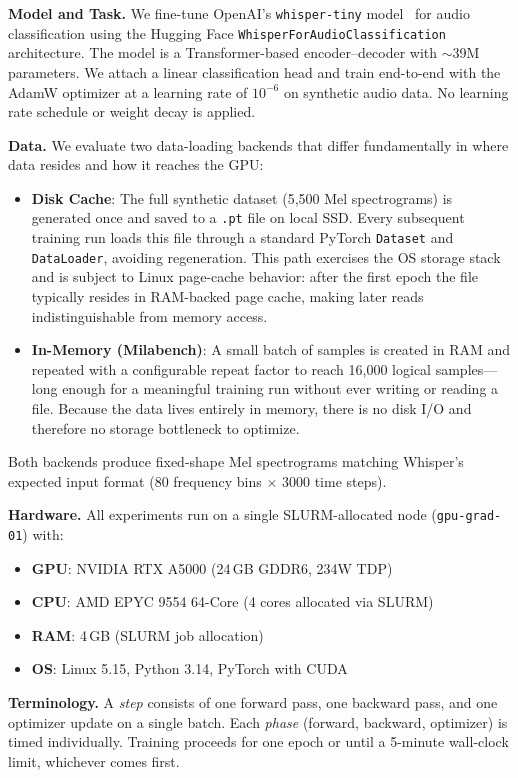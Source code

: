 \documentclass[10pt,twocolumn]{article}
\begin{document}
\textbf{Model and Task.}
We fine-tune OpenAI's \texttt{whisper-tiny} model~\cite{whisper} for audio classification using the Hugging Face \texttt{WhisperForAudioClassification} architecture. The model is a Transformer-based encoder--decoder with $\sim$39M parameters. We attach a linear classification head and train end-to-end with the AdamW optimizer at a learning rate of $10^{-6}$ on synthetic audio data. No learning rate schedule or weight decay is applied.

\textbf{Data.}
We evaluate two data-loading backends that differ fundamentally in where data resides and how it reaches the GPU:
\begin{itemize}
    \item \textbf{Disk Cache}: The full synthetic dataset (5{,}500 Mel spectrograms) is generated once and saved to a \texttt{.pt} file on local SSD. Every subsequent training run loads this file through a standard PyTorch \texttt{Dataset} and \texttt{DataLoader}, avoiding regeneration. This path exercises the OS storage stack and is subject to Linux page-cache behavior: after the first epoch the file typically resides in RAM-backed page cache, making later reads indistinguishable from memory access.
    \item \textbf{In-Memory (Milabench)}: A small batch of samples is created in RAM and repeated with a configurable repeat factor to reach 16{,}000 logical samples---long enough for a meaningful training run without ever writing or reading a file. Because the data lives entirely in memory, there is no disk I/O and therefore no storage bottleneck to optimize.
\end{itemize}
Both backends produce fixed-shape Mel spectrograms matching Whisper's expected input format (80 frequency bins $\times$ 3000 time steps).

\textbf{Hardware.}
All experiments run on a single SLURM-allocated node (\texttt{gpu-grad-01}) with:
\begin{itemize}
    \item \textbf{GPU}: NVIDIA RTX A5000 (24\,GB GDDR6, 234W TDP)
    \item \textbf{CPU}: AMD EPYC 9554 64-Core (4 cores allocated via SLURM)
    \item \textbf{RAM}: 4\,GB (SLURM job allocation)
    \item \textbf{OS}: Linux 5.15, Python 3.14, PyTorch with CUDA
\end{itemize}

\textbf{Terminology.}
A \emph{step} consists of one forward pass, one backward pass, and one optimizer update on a single batch. Each \emph{phase} (forward, backward, optimizer) is timed individually. Training proceeds for one epoch or until a 5-minute wall-clock limit, whichever comes first.
\end{document}
